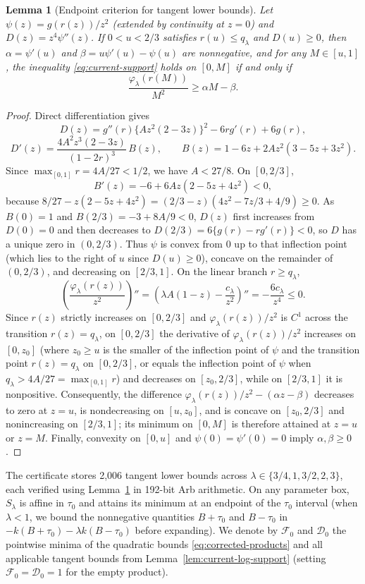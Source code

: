 \documentclass[11pt]{article}
\numberwithin{equation}{section}
\newtheorem{lemma}[theorem]{Lemma}
\theoremstyle{remark}
\begin{document}
\begin{lemma}[Endpoint criterion for tangent lower bounds]\label{lem:current-log-tangent}
Let $\psi(z)=g(r(z))/z^2$ (extended by continuity at $z=0$) and
$D(z)=z^4\psi''(z)$. If $0<u<2/3$ satisfies $r(u)\le q_\lambda$ and
$D(u)\ge0$, then $\alpha=\psi'(u)$ and $\beta=u\psi'(u)-\psi(u)$ are
nonnegative, and for any $M\in[u,1]$, the inequality \eqref{eq:current-support}
holds on $[0,M]$ if and only if
\[
 \frac{\varphi_\lambda(r(M))}{M^2}\ge\alpha M-\beta.
\]
\end{lemma}
\begin{proof}
Direct differentiation gives
\[
 D(z)=g''(r)\{Az^2(2-3z)\}^2-6rg'(r)+6g(r),
\]
\[
 D'(z)=\frac{4A^2z^3(2-3z)}{(1-2r)^3}\,B(z),\qquad
 B(z)=1-6z+2Az^2(3-5z+3z^2).
\]
Since $\max_{[0,1]}r=4A/27<1/2$, we have $A<27/8$. On $[0,2/3]$,
\[
 B'(z)=-6+6Az(2-5z+4z^2)<0,
\]
because $8/27-z(2-5z+4z^2)=(2/3-z)(4z^2-7z/3+4/9)\ge0$. As $B(0)=1$ and
$B(2/3)=-3+8A/9<0$, $D(z)$ first increases from $D(0)=0$ and then decreases
to $D(2/3)=6\{g(r)-rg'(r)\}<0$, so $D$ has a unique zero in $(0,2/3)$. Thus
$\psi$ is convex from $0$ up to that inflection point (which lies to the
right of $u$ since $D(u)\ge0$), concave on the remainder of $(0,2/3)$, and
decreasing on $[2/3,1]$. On the linear branch $r\ge q_\lambda$,
\[
 \left(\frac{\varphi_\lambda(r(z))}{z^2}\right)''
 =\left(\lambda A(1-z)-\frac{c_\lambda}{z^2}\right)''
 =-\frac{6c_\lambda}{z^4}\le0.
\]
Since $r(z)$ strictly increases on $[0,2/3]$ and $\varphi_\lambda(r(z))/z^2$
is $C^1$ across the transition $r(z)=q_\lambda$, on $[0,2/3]$ the derivative
of $\varphi_\lambda(r(z))/z^2$ increases on $[0,z_0]$ (where $z_0\ge u$ is the
smaller of the inflection point of $\psi$ and the transition point
$r(z)=q_\lambda$ on $[0,2/3]$, or equals the inflection point of $\psi$ when
$q_\lambda>4A/27=\max_{[0,1]}r$) and decreases on $[z_0,2/3]$, while on
$[2/3,1]$ it is nonpositive. Consequently, the difference
$\varphi_\lambda(r(z))/z^2-(\alpha z-\beta)$ decreases to zero at $z=u$, is
nondecreasing on $[u,z_0]$, and is concave on $[z_0,2/3]$ and nonincreasing on
$[2/3,1]$; its minimum on $[0,M]$ is therefore attained at $z=u$ or $z=M$.
Finally, convexity on $[0,u]$ and $\psi(0)=\psi'(0)=0$ imply
$\alpha,\beta\ge0$.
\end{proof}

The certificate  stores 2,006
tangent lower bounds across $\lambda\in\{3/4,1,3/2,2,3\}$, each verified
using Lemma~\ref{lem:current-log-tangent} in 192-bit Arb arithmetic. On any
parameter box, $S_\lambda$ is affine in $\tau_0$ and attains its minimum at
an endpoint of the $\tau_0$ interval (when $\lambda<1$, we bound the
nonnegative quantities $B+\tau_0$ and $B-\tau_0$ in
$-k(B+\tau_0)-\lambda k(B-\tau_0)$ before expanding). We denote by
$\mathcal F_0$ and $\mathcal D_0$ the pointwise minima of the quadratic
bounds \eqref{eq:corrected-products} and all applicable tangent bounds from
Lemma~\ref{lem:current-log-support} (setting $\mathcal F_0=\mathcal D_0=1$ for
the empty product).
\end{document}
